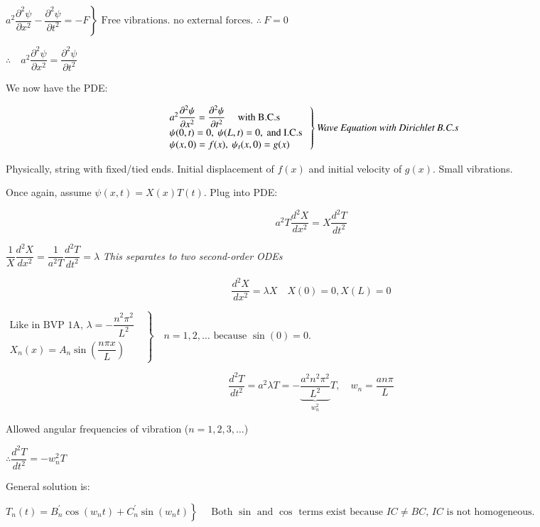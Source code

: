 \documentclass{report}
\begin{document}
$\left.a^{2} \dfrac{\partial^{2} \psi}{\partial x^{2}}-\dfrac{\partial^{2} \psi}{\partial t^{2}}=-F\right\} \text { Free vibrations. no external forces. $\therefore\ F=0$}$ 

$\therefore\quad a^{2} \dfrac{\partial^{2} \psi}{\partial x^{2}}=\dfrac{\partial^{2} \psi}{\partial t^{2}}$

We now have the PDE:

$$
\left.\begin{array}{l}
a^{2} \dfrac{\partial^{2} \psi}{\partial x^{2}}=\dfrac{\partial^{2} \psi}{\partial t^{2}} \quad \text { with B.C.s } \\
\psi(0, t)=0,\ \psi(L, t)=0, \text { and I.C.s } \\
\psi(x, 0)=f(x),\ \psi_{t}(x, 0)=g(x)
\end{array}\right\}\text{\textit{Wave Equation with Dirichlet B.C.s}}
$$

Physically, string with fixed/tied ends. Initial displacement of $f(x)$ and initial velocity of $g(x)$. Small vibrations.

Once again, assume $\psi(x, t)=X(x) T(t)$. Plug into PDE:

$$
a^{2} T \dfrac{d^{2} X}{d x^{2}}=X \dfrac{d^{2} T}{d t^{2}}
$$

$\dfrac{1}{X} \dfrac{d^{2} X}{d x^{2}}=\dfrac{1}{a^{2} T} \dfrac{d^{2} T}{d t^{2}}=\lambda$ \textit{This separates to two second-order ODEs}

$$
\dfrac{d^{2} X}{d x^{2}}=\lambda X \quad X(0)=0, X(L)=0
$$

$\left.\begin{array}{l}
     \text{Like in BVP 1A, $\lambda=-\dfrac{n^{2} \pi^{2}}{L^{2}}$ } \\
     X_{n}(x)=A_{n} \sin \left(\dfrac{n \pi x}{L}\right) 
\end{array}\right\}\quad n=1,2, \ldots\text{ because $\sin(0)=0$}.$


$$
\dfrac{d^{2} T}{d t^{2}}=a^{2} \lambda T=-\underbrace{\dfrac{a^{2} n^{2} \pi^{2}}{L^{2}}}_{w_n^2} T,\quad w_{n}=\dfrac{a n \pi}{L}
$$

Allowed angular frequencies of vibration ($n=1,2,3, \ldots$)

$\therefore \dfrac{d^{2} T}{d t^{2}}=-w_{n}^{2} T$ 

General solution is:

$\left.T_{n}(t)=B_{n}^{\prime} \cos \left(w_{n} t\right)+C_{n}^{\prime} \sin \left(w_{n} t\right)\right\}\quad\text { Both $\sin$ and $\cos$ terms exist because $IC \neq B C$, $I C$ is not homogeneous.}$
\end{document}
